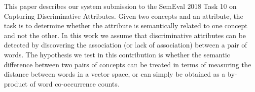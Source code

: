 This paper describes our system submission to the SemEval 2018 Task 10 on Capturing Discriminative Attributes. Given two concepts and an attribute, the task is to determine whether the attribute is semantically related to one concept and not the other. In this work we assume that discriminative attributes can be detected by discovering the association (or lack of association) between a pair of words. The hypothesis we test in this contribution is whether the semantic difference between two pairs of concepts can be treated in terms of measuring the distance between words in a vector space, or can simply be obtained as a by-product of word co-occurrence counts.
